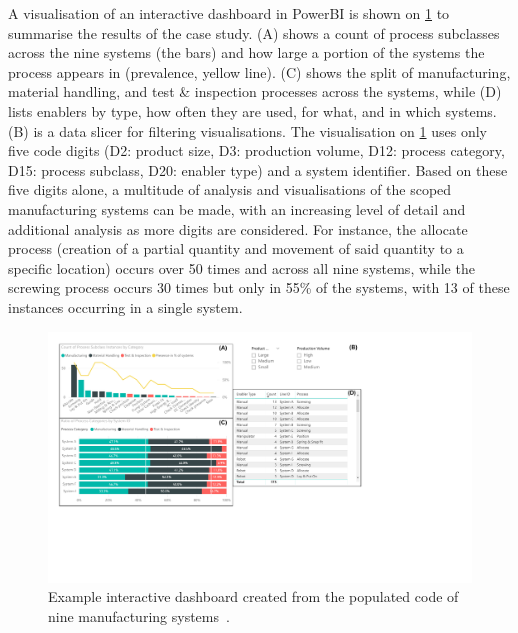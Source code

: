 A visualisation of an interactive dashboard in PowerBI is shown on \cref{fig:clsfVis} to summarise the results of the case study.
(A) shows a count of process subclasses across the nine systems (the bars) and how large a portion of the systems the process appears in (prevalence, yellow line).
(C) shows the split of manufacturing, material handling, and test \& inspection processes across the systems, while (D) lists enablers by type, how often they are used, for what, and in which systems.
(B) is a data slicer for filtering visualisations.
The visualisation on \cref{fig:clsfVis} uses only five code digits (D2: product size, D3: production volume, D12: process category, D15: process subclass, D20: enabler type) and a system identifier.
Based on these five digits alone, a multitude of analysis and visualisations of the scoped manufacturing systems can be made, with an increasing level of detail and additional analysis as more digits are considered.
For instance, the allocate process (creation of a partial quantity and movement of said quantity to a specific location) occurs over 50 times and across all nine systems, while the screwing process occurs 30 times but only in 55\% of the systems, with 13 of these instances occurring in a single system.
\begin{figure}[tb]
  \includegraphics[width=\textwidth]{mainmatter/researchResults/figures/clsfVis.pdf}
  \caption[Example dashboard created from the populated code of nine manufacturing systems.]
  {Example interactive dashboard created from the populated code of nine manufacturing systems~\parencite{SorensenClsfCoding}.}\label{fig:clsfVis}
\end{figure}

